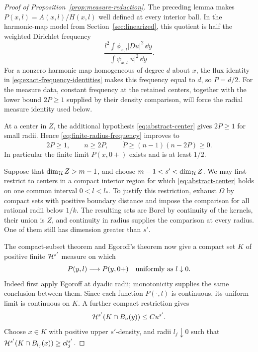 \begin{proof}[Proof of Proposition~\ref{prop:measure-reduction}]
The preceding lemma makes $P(x,l)=A(x,l)/H(x,l)$ well defined at
every interior ball. In the harmonic-map model from
Section~\ref{sec:linearized}, this quotient is half the weighted
Dirichlet frequency
\[
 \frac{l^2\int\phi_{x,l}|Du|^2\,\dd y}
      {\int\psi_{x,l}|u|^2\,\dd y}.
\]
For a nonzero harmonic map homogeneous of degree $d$ about $x$, the
flux identity in \eqref{eq:exact-frequency-identities} makes this
frequency equal to $d$, so $P=d/2$. For the measure data, constant
frequency at the retained centers, together with the lower bound
$2P\ge1$ supplied by their density comparison, will force the radial
measure identity used below.

At a center in $Z$, the additional hypothesis
\eqref{eq:abstract-center} gives $2P\ge1$ for small radii. Hence
\eqref{eq:finite-radius-frequency} improves to
\begin{equation}
 \label{eq:center-frequency-monotonicity}
 2P\ge1,\qquad n\ge2P,\qquad
 \dot P\ge(n-1)(n-2P)\ge0.
\end{equation}
In particular the finite limit $P(x,0+)$ exists and is at least
$1/2$.

Suppose that $\dim_{\mathcal H}Z>m-1$, and choose
$m-1<s'<\dim_{\mathcal H}Z$. We may first restrict to centers in a compact
interior region for which \eqref{eq:abstract-center} holds on one
common interval $0<l<l_*$. To justify this restriction, exhaust
$\Omega$ by compact sets with positive boundary distance and impose
the comparison for all rational radii below $1/k$. The resulting
sets are Borel by continuity of the kernels, their union is $Z$, and
continuity in radius supplies the comparison at every radius. One
of them still has dimension greater than $s'$.

The compact-subset theorem and Egoroff's theorem now give a compact
set $K$ of positive finite $\mathcal H^{s'}$ measure on which
\begin{equation}
 \label{eq:uniform-center-frequency}
 P(y,l)\longrightarrow P(y,0+)\quad\hbox{uniformly as }l\downarrow0.
\end{equation}
Indeed first apply Egoroff at dyadic radii; monotonicity supplies the
same conclusion between them. Since each function $P(\cdot,l)$ is
continuous, its uniform limit is continuous on $K$. A further
compact restriction gives
\begin{equation}
 \label{eq:second-center-frostman}
 \mathcal H^{s'}(K\cap B_u(y))\le C u^{s'}.
\end{equation}
Choose $x\in K$ with positive upper $s'$-density, and radii
$l_j\downarrow0$ such that
$\mathcal H^{s'}(K\cap B_{l_j}(x))\ge c l_j^{s'}$.


\end{proof}
